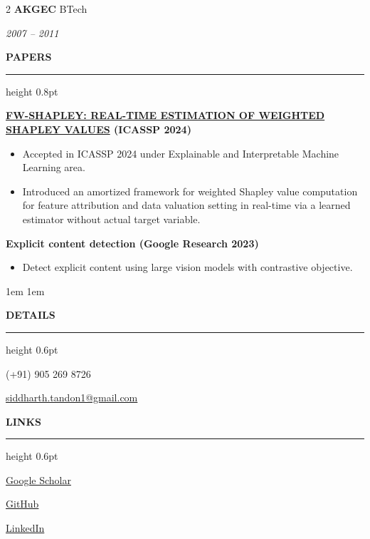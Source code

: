\documentclass[10pt, a4paper]{article}
\newcommand{\cvsection}[1]{%
  \vspace{1.2\baselineskip}%
  {\large\bfseries\sffamily\MakeUppercase{#1}}\par\vspace{0.4ex}%
  {\color{black!70}\hrule height 0.8pt}\par
  \vspace{0.8\baselineskip}%
}
\newcommand{\sidebarsection}[1]{%
  \vspace{1.2\baselineskip}%
  {\color{white}\bfseries\sffamily\MakeUppercase{#1}}\par%
  \vspace{0.6ex}%
  {\color{white!60}\hrule height 0.6pt}\par%
  \vspace{0.5\baselineskip}%
}
\begin{document}
\begin{paracol}{2}
{\bfseries AKGEC} \hfill BTech \par
\textit{2007 – 2011}

\cvsection{Papers}
{\bfseries \href{https://cmsworkshops.com/ICASSP2024/view_paper.php?PaperNum=4738}{FW-SHAPLEY: REAL-TIME ESTIMATION OF WEIGHTED SHAPLEY VALUES} (ICASSP 2024)}\par
\begin{itemize}
    \item Accepted in ICASSP 2024 under Explainable and Interpretable Machine Learning area.
    \item Introduced an amortized framework for weighted Shapley value computation for feature attribution and data valuation setting in real-time via a learned estimator without actual target variable.
\end{itemize}
\vspace{1.5\baselineskip}
{\bfseries Explicit content detection (Google Research 2023)}\par
\begin{itemize}
    \item Detect explicit content using large vision models with contrastive objective.
\end{itemize}


\switchcolumn

\color{white} %
\leftskip1em  %
\rightskip1em %
\vspace*{2.5\baselineskip} %

\sidebarsection{Details}
(+91) 905 269 8726\par
\vspace{0.5ex}
\href{mailto:siddharth.tandon1@gmail.com}{siddharth.tandon1@gmail.com}
    
\sidebarsection{Links}
\href{https://scholar.google.com/citations?view_op=list_works&hl=en&authuser=1&user=REyR8UEAAAAJ}{Google Scholar}\par
\vspace{0.5ex}
\href{https://github.com/sidtandon2014}{GitHub}\par
\vspace{0.5ex}
\href{http://www.linkedin.com/in/siddharthtandon1}{LinkedIn}\par


\end{paracol}
\end{document}
